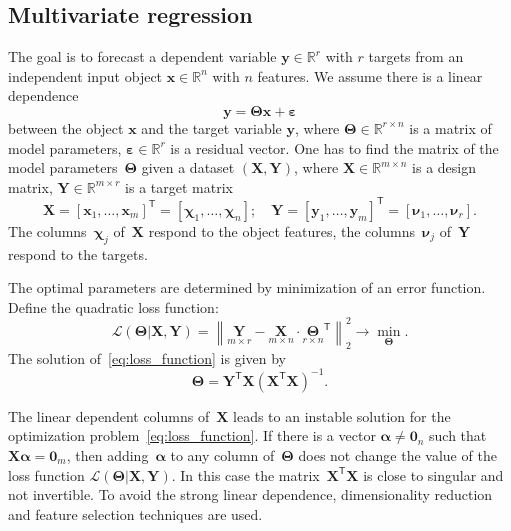 \documentclass[12pt,oneside]{article}
\theoremstyle{definition}
\newcommand{\bx}{\mathbf{x}}
\newcommand{\by}{\mathbf{y}}
\newcommand{\bY}{\mathbf{Y}}
\newcommand{\bX}{\mathbf{X}}
\newcommand{\bbR}{\mathbb{R}}
\newcommand{\T}{\mathsf{T}}
\newcommand{\bchi}{\boldsymbol{\chi}}
\newcommand{\bnu}{\boldsymbol{\nu}}
\newcommand{\bTheta}{\boldsymbol{\Theta}}
\newcommand{\bZero}{\boldsymbol{0}}
\begin{document}
\subsection{Multivariate regression}
The goal is to forecast a dependent variable $\by \in \bbR^r$ with $r$ targets from an independent input object $\bx \in \bbR^n$ with $n$ features.
We assume there is a linear dependence
\begin{equation}
	\by = \bTheta \bx+ \boldsymbol{\varepsilon}
	\label{eq:model}
\end{equation}
between the object $\bx$ and the target variable $\by$,
where $\bTheta \in \bbR^{r \times n}$ is a matrix of model parameters, $\boldsymbol{\varepsilon} \in \bbR^{r}$ is a residual vector.
One has to find the matrix of the model parameters~$\bTheta$ given a dataset $\left( \bX, \bY \right)$, where $\bX \in \bbR^{m \times n}$ is a design matrix, $\bY \in \bbR^{m \times r}$ is a target matrix
\begin{equation}
	\bX = [\bx_1, \dots, \bx_m]^{\T} =  [\bchi_1, \dots, \bchi_n]; \quad \bY = [\by_1, \dots, \by_m]^{\T} =  [\bnu_1, \dots, \bnu_r].
\end{equation}
The columns~$\bchi_j$ of~$\bX$ respond to the object features, the columns~$\bnu_j$ of~$\bY$ respond to the targets.

The optimal parameters are determined by minimization of an error function.
Define the quadratic loss function:
\begin{equation}
	\mathcal{L}(\bTheta | \bX, \bY) = {\left\| \underset{m \times r}{\mathbf{Y}}  - \underset{m \times n}{\bX} \cdot \underset{r \times n}{\bTheta}^{\T} \right\| }_2^2 \rightarrow\min_{\bTheta}.
\label{eq:loss_function}
\end{equation}
The solution of~\eqref{eq:loss_function} is given by
 \begin{equation}
 	\bTheta = \bY^{\T} \bX (\bX^{\T} \bX)^{-1}.
 \end{equation}

 The linear dependent columns of~$\bX$ leads to an instable solution for the optimization problem~\eqref{eq:loss_function}.
 If there is a vector $\boldsymbol{\alpha} \neq \bZero_n$ such that $\bX \boldsymbol{\alpha}= \bZero_m$, then adding~$\boldsymbol{\alpha}$ to any column of~$\bTheta$ does not change the value of the loss function $\mathcal{L}(\bTheta | \bX, \bY)$.
 In this case the matrix~$\bX^{\T} \bX$ is close to singular and not invertible.
 To avoid the strong linear dependence, dimensionality reduction and feature selection techniques are used.
 
\end{document}
